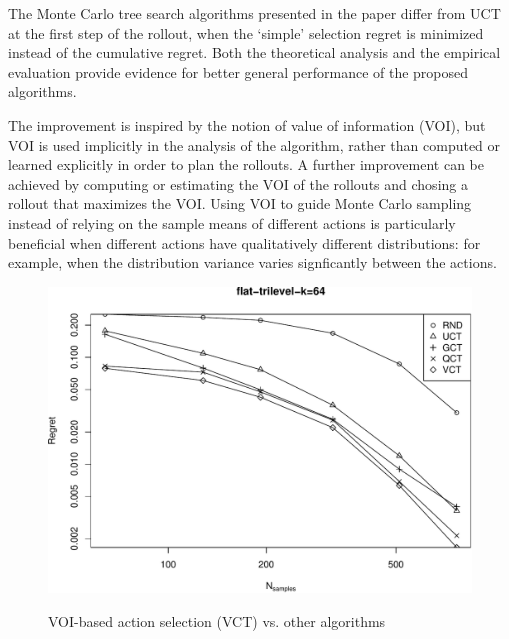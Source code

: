 \documentclass{article}
\begin{document}
The Monte Carlo tree search algorithms presented in the paper differ
from UCT at the first step of the rollout, when the `simple' selection
regret is minimized instead of the cumulative regret. Both the
theoretical analysis and the empirical evaluation provide evidence for
better general performance of the proposed algorithms.

The improvement is inspired by the notion of value of information (VOI),
but VOI is used implicitly in the analysis of the algorithm, rather
than computed or learned explicitly in order to plan the rollouts. A
further improvement can be achieved by computing or estimating the VOI
of the rollouts and chosing a rollout that maximizes the VOI. Using VOI
to guide Monte Carlo sampling instead of relying on the sample means
of different actions  is particularly beneficial when different
actions have qualitatively different distributions: for example, when the
distribution variance varies signficantly between the actions.

\begin{figure}[t]
  \centering
  \includegraphics[scale=0.45,trim=0 0 0 16pt,clip]{flat-trilevel-vct-k=64.pdf}\\
  \caption{VOI-based action selection (VCT) vs. other algorithms}
  \label{fig:flat-trilevel-vct}
\end{figure}
\end{document}

